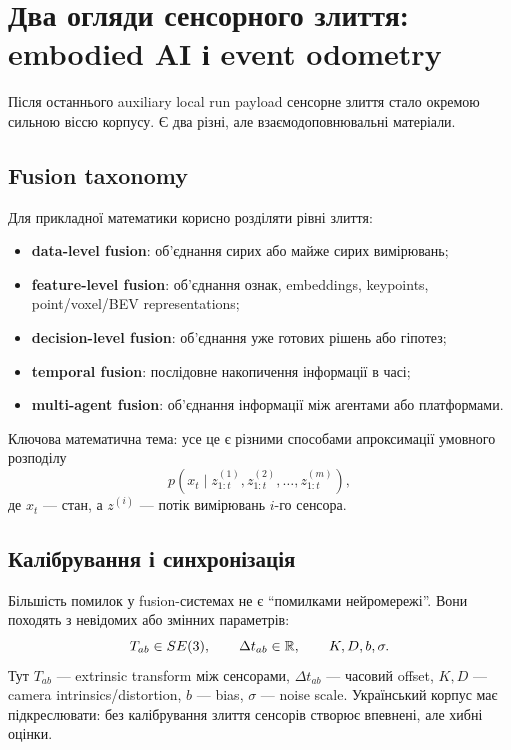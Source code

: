 \chapter{Два огляди сенсорного злиття: embodied AI і event odometry}
\label{chap:dual-sensor-fusion}


Після останнього auxiliary local run payload сенсорне злиття стало окремою сильною віссю корпусу. Є два різні, але взаємодоповнювальні матеріали.

\section{Fusion taxonomy}

Для прикладної математики корисно розділяти рівні злиття:
\begin{itemize}[leftmargin=*]
\item \textbf{data-level fusion}: об'єднання сирих або майже сирих вимірювань;
\item \textbf{feature-level fusion}: об'єднання ознак, embeddings, keypoints, point/voxel/BEV representations;
\item \textbf{decision-level fusion}: об'єднання уже готових рішень або гіпотез;
\item \textbf{temporal fusion}: послідовне накопичення інформації в часі;
\item \textbf{multi-agent fusion}: об'єднання інформації між агентами або платформами.
\end{itemize}

Ключова математична тема: усе це є різними способами апроксимації умовного розподілу
\begin{equation}
  p(x_t\mid z_{1:t}^{(1)},z_{1:t}^{(2)},\ldots,z_{1:t}^{(m)}),
\end{equation}
де $x_t$ --- стан, а $z^{(i)}$ --- потік вимірювань $i$-го сенсора.

\section{Калібрування і синхронізація}

Більшість помилок у fusion-системах не є ``помилками нейромережі''. Вони походять з невідомих або змінних параметрів:
\begin{equation}
  T_{ab}\in SE(3),\qquad \Delta t_{ab}\in\mathbb{R},\qquad K, D, b, \sigma.
\end{equation}
Тут $T_{ab}$ --- extrinsic transform між сенсорами, $\Delta t_{ab}$ --- часовий offset, $K,D$ --- camera intrinsics/distortion, $b$ --- bias, $\sigma$ --- noise scale. Український корпус має підкреслювати: без калібрування злиття сенсорів створює впевнені, але хибні оцінки.

